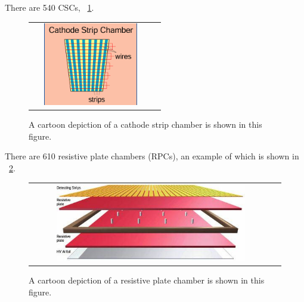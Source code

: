 There are 540 CSCs, ~\ref{fig:CSC}.

\begin{figure}[!ht]
\begin{center}
\begin{tabular}{cc}
\includegraphics[width=0.8\textwidth]{cms/figs/CSC.png}
\end{tabular}
\caption{ A cartoon depiction of a cathode strip chamber is shown in this figure. 
\label{fig:CSC}
}
\end{center}
\end{figure}

There are 610 resistive plate chambers (RPCs), an example of which is shown in ~\ref{fig:RPC}.

\begin{figure}[!ht]
\begin{center}
\begin{tabular}{cc}
\includegraphics[width=0.8\textwidth]{cms/figs/RPClayers.png}
\end{tabular}
\caption{ A cartoon depiction of a resistive plate chamber is shown in this figure. 
\label{fig:RPC}
}
\end{center}
\end{figure}


